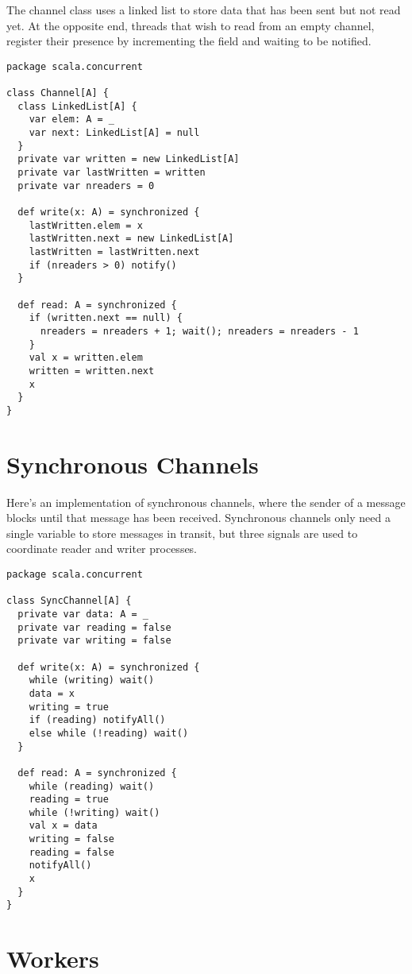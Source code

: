 {The channel class uses a linked list to store data that has been sent
but not read yet. At the opposite end, threads that
wish to read from an empty channel, register their presence by
incrementing the  field and waiting to be notified.
\begin{lstlisting}
package scala.concurrent

class Channel[A] {
  class LinkedList[A] {
    var elem: A = _
    var next: LinkedList[A] = null
  }
  private var written = new LinkedList[A]
  private var lastWritten = written
  private var nreaders = 0

  def write(x: A) = synchronized {
    lastWritten.elem = x
    lastWritten.next = new LinkedList[A]
    lastWritten = lastWritten.next
    if (nreaders > 0) notify()
  }

  def read: A = synchronized {
    if (written.next == null) {
      nreaders = nreaders + 1; wait(); nreaders = nreaders - 1
    }
    val x = written.elem
    written = written.next
    x
  }
}
\end{lstlisting}

\section{Synchronous Channels}

Here's an implementation of synchronous channels, where the sender of
a message blocks until that message has been received. Synchronous
channels only need a single variable to store messages in transit, but
three signals are used to coordinate reader and writer processes.
\begin{lstlisting}
package scala.concurrent

class SyncChannel[A] {
  private var data: A = _
  private var reading = false
  private var writing = false

  def write(x: A) = synchronized {
    while (writing) wait()
    data = x
    writing = true
    if (reading) notifyAll()
    else while (!reading) wait()
  }

  def read: A = synchronized {
    while (reading) wait()
    reading = true
    while (!writing) wait()
    val x = data
    writing = false
    reading = false
    notifyAll()
    x
  }
}
\end{lstlisting}

\section{Workers}

}
